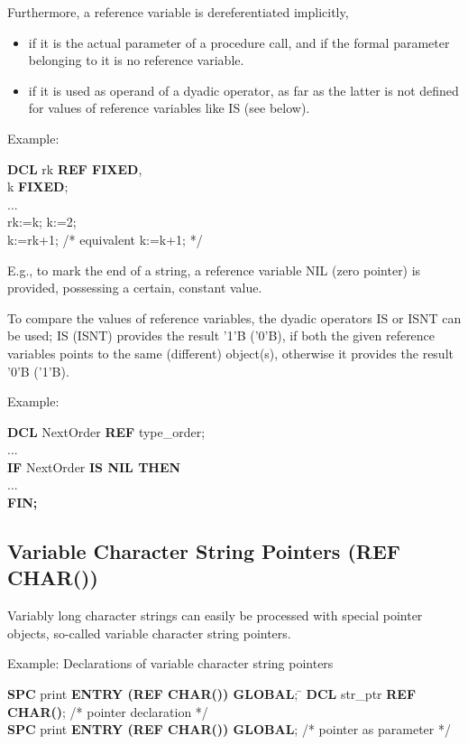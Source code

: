 Furthermore, a reference variable is dereferentiated implicitly,
\begin{itemize}
\item if it is the actual parameter of a procedure call, and if the
formal parameter belonging to it is no reference variable.
\item if it is used as operand of a dyadic operator, as far as the
latter is not defined for values of reference variables like IS (see
below).
\end{itemize}

Example:

{\bf DCL} rk {\bf REF FIXED},\\
\x k {\bf FIXED};\\
\x ...\\
\x rk:=k; k:=2;\\
\x k:=rk+1; /* equivalent     k:=k+1; */

E.g., to mark the end of a string, a reference variable NIL (zero
pointer) is provided, possessing a certain, constant value.

To compare the values of reference variables, the dyadic operators IS or
ISNT can be used; IS (ISNT) provides the result '1'B ('0'B), if both the
given reference variables points to the same (different) object(s),
otherwise it provides the result '0'B ('1'B).

Example:

{\bf DCL} NextOrder {\bf REF} type\_order;\\
...\\
{\bf IF} NextOrder {\bf IS NIL THEN}\\
\x ...\\
{\bf FIN;}

\subsection{Variable Character String Pointers (REF CHAR())}  %
\label{sec_ref_char}

Variably long character strings can easily be processed with special
pointer objects, so-called variable character string pointers.

Example: Declarations of variable character string pointers

\begin{tabbing}
{\bf SPC} print {\bf ENTRY (REF CHAR()) GLOBAL}; \=  \kill
{\bf DCL} str\_ptr {\bf REF CHAR()}; \> /* pointer declaration */       \\
{\bf SPC} print {\bf ENTRY (REF CHAR()) GLOBAL}; \>  /* pointer as parameter */
\end{tabbing}

